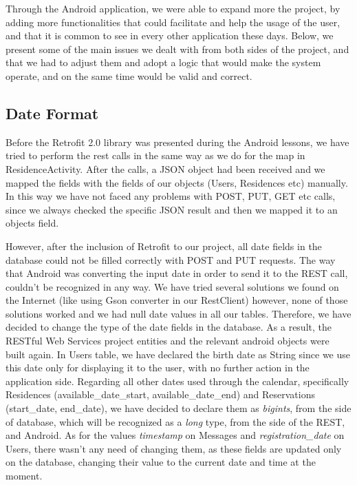 \documentclass[12pt]{article}
\begin{document}
    Through the Android application, we were able to expand more the project, by adding more functionalities that could facilitate and help the usage of the user, and that it is common to see in every other application these days. Below, we present some of the main issues we dealt with from both sides of the project, and that we had to adjust them and adopt a logic that would make the system operate, and on the same time would be valid and correct.

	\subsection{Date Format}
	Before the Retrofit 2.0 library was presented during the Android lessons, we have tried to perform the rest calls in the same way as we do for the map in ResidenceActivity. After the calls, a JSON object had been received and we mapped the fields with the fields of our objects (Users, Residences etc) manually. In this way we have not faced any problems with POST, PUT, GET etc calls, since we always checked the specific JSON result and then we mapped it to an objects field.
	
	However, after the inclusion of Retrofit to our project, all date fields in the database could not be filled correctly with POST and PUT requests. The way that Android was converting the input date in order to send it to the REST call, couldn't be recognized in any way. We have tried several solutions we found on the Internet (like using Gson converter in our RestClient) however, none of those solutions worked and we had null date values in all our tables. Therefore, we have decided to change the type of the date fields in the database. As a result, the RESTful Web Services project entities and the relevant android objects were built again. In Users table, we have declared the birth date as String since we use this date only for displaying it to the user, with no further action in the application side. Regarding all other dates used through the calendar, specifically Residences (available\_date\_start, available\_date\_end) and Reservations (start\_date, end\_date), we have decided to declare them as \textit{bigints}, from the side of database, which will be recognized as a \textit{long} type, from the side of the REST, and Android. As for the values \textit{timestamp} on Messages and \textit{registration\_date} on Users, there wasn't any need of changing them, as these fields are updated only on the database, changing their value to the current date and time at the moment.
	
\end{document}
